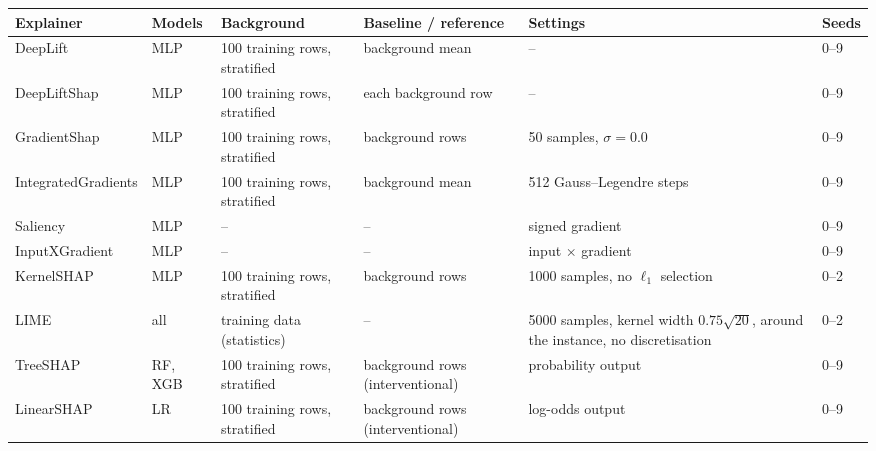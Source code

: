 \small
\begin{tabular}{llllp{5cm}l}
\toprule
Explainer & Models & Background & Baseline / reference & Settings & Seeds \\
\midrule
DeepLift & MLP & 100 training rows, stratified & background mean & -- & 0--9 \\
DeepLiftShap & MLP & 100 training rows, stratified & each background row & -- & 0--9 \\
GradientShap & MLP & 100 training rows, stratified & background rows & 50 samples, $\sigma = 0.0$ & 0--9 \\
IntegratedGradients & MLP & 100 training rows, stratified & background mean & 512 Gauss--Legendre steps & 0--9 \\
Saliency & MLP & -- & -- & signed gradient & 0--9 \\
InputXGradient & MLP & -- & -- & input $\times$ gradient & 0--9 \\
KernelSHAP & MLP & 100 training rows, stratified & background rows & 1000 samples, no $\ell_1$ selection & 0--2 \\
LIME & all & training data (statistics) & -- & 5000 samples, kernel width $0.75\sqrt{20}$, around the instance, no discretisation & 0--2 \\
TreeSHAP & RF, XGB & 100 training rows, stratified & background rows (interventional) & probability output & 0--9 \\
LinearSHAP & LR & 100 training rows, stratified & background rows (interventional) & log-odds output & 0--9 \\
\bottomrule
\end{tabular}
